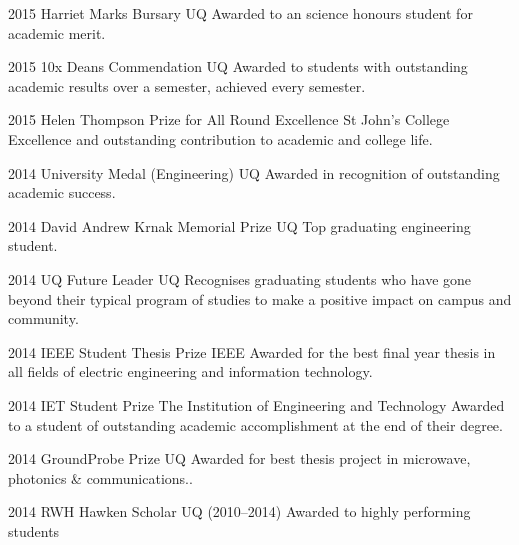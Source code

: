 \documentclass[]{friggeri-cv} %
\begin{document}
\begin{entrylist}
	\entryInlineSmall
	{2015}
	{Harriet Marks Bursary}
	{UQ}
	{Awarded to an science honours student for academic merit.}
\end{entrylist}
\begin{entrylist}
\entryInlineSmall
{2015}
{10x Deans Commendation}
{UQ}
{Awarded to students with outstanding academic results over a semester, achieved every semester.}
\end{entrylist}
\begin{entrylist}
\entryInlineSmall
{2015}
{Helen Thompson Prize for All Round Excellence}
{St John's College}
{Excellence and outstanding contribution to academic and college life.}
\end{entrylist}
\begin{entrylist}
	\entryInlineSmall
	{2014}
	{University Medal (Engineering)}
	{UQ}
	{Awarded in recognition of outstanding academic success.}
\end{entrylist}
\begin{entrylist}
	\entryInlineSmall
	{2014}
	{David Andrew Krnak Memorial Prize}
	{UQ}
	{Top graduating engineering student.}
\end{entrylist}
\begin{entrylist}
	\entryInlineSmall
	{2014}
	{UQ Future Leader}
	{UQ}
	{Recognises graduating students who have gone beyond their typical program of studies to make a positive impact on campus and community.}
\end{entrylist}
\begin{entrylist}
	\entryInlineSmall
	{2014}
	{IEEE Student Thesis Prize}
	{IEEE}
	{Awarded for the best final year thesis in all fields of electric engineering and information technology.}
\end{entrylist}
\begin{entrylist}
	\entryInlineSmall
	{2014}
	{IET Student Prize}
	{The Institution of Engineering and Technology}
	{Awarded to a student of outstanding academic accomplishment at the end of their degree.}
\end{entrylist}
\begin{entrylist}
	\entryInlineSmall
	{2014}
	{GroundProbe Prize}
	{UQ}
	{Awarded for best thesis project in microwave, photonics \& communications..}
\end{entrylist}
\begin{entrylist}
	\entryInlineSmall
	{2014}
	{RWH Hawken Scholar}
	{UQ}
	{(2010--2014) Awarded to highly performing students}
\end{entrylist}
\end{document}

